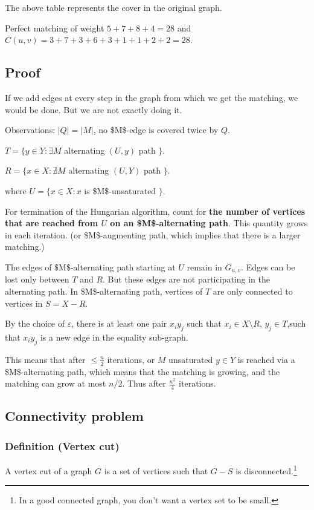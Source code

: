 \documentclass[11pt]{article}
\begin{document}
The above table represents the cover in the original graph.

Perfect matching of weight \(5 + 7 + 8 + 4= 28\) and \(C(u, v) = 3 + 7 + 3 + 6 +
   3+ 1 + 1 + 2 + 2 = 28\).
\subsection{Proof}
\label{sec:org445b631}
If we add edges at every step in the graph from which we get the matching, we
would be done. But we are not exactly doing it.

Observations: \(\vert Q \vert = \vert M \vert\), no \$M\$-edge is covered twice by \(Q\).

\(T = \{y \in Y \colon \exists M\) alternating \((U, y)\) path \(\}\).

\(R = \{x \in X \colon \nexists M\) alternating \((U, Y)\) path \(\}\).

where \(U = \{x \in X \colon x\) is \$M\$-unsaturated \(\}\).

For termination of the Hungarian algorithm, count for \textbf{the number of vertices
that are reached from \(U\) on an \$M\$-alternating path}. This quantity grows in
each iteration. (or \$M\$-augmenting path, which implies that there is a larger
matching.)

The edges of \$M\$-alternating path starting at \(U\) remain in \(G_{u, v}\). Edges
can be lost only between \(T\) and \(R\). But these edges are not participating
in the alternating path. In \$M\$-alternating path, vertices of \(T\) are only
connected to vertices in \(S = X - R\).

By the choice of \(\varepsilon\), there is at least one pair \(x_i y_j\) such
that \(x_i \in X \setminus R\), \(y_j \in T\),such that \(x_i y_j\) is a new edge
in the equality sub-graph.

This means that after \(\le \frac{n}{2}\) iterations, or \(M\) unsaturated \(y\in
   Y\) is reached via a \$M\$-alternating path, which means that the matching is
growing, and the matching can grow at most \(n/2\). Thus after \(\frac{n^2}{4}\)
iterations.
\subsection{Connectivity problem}
\label{sec:org8f31821}
\subsubsection{Definition (Vertex cut)}
\label{sec:orgdc4e00b}
A vertex cut of a graph \(G\) is a set of vertices such that \(G-S\) is
disconnected.\footnote{In a good connected graph, you don't want a vertex set to be small.}
\end{document}
